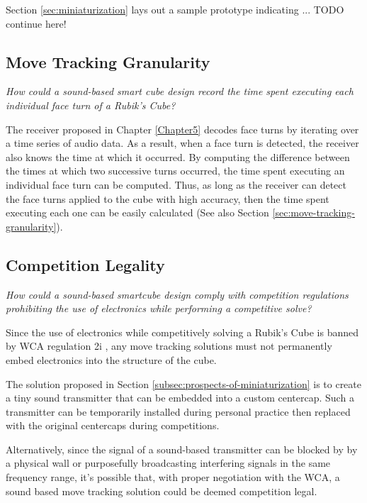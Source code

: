 Section \ref{sec:miniaturization} lays out a sample prototype indicating ... TODO continue here!

\subsection{Move Tracking Granularity}
\label{subsec:answer-granularity}

\emph{How could a sound-based smart cube design record the time spent
executing each individual face turn of a Rubik's Cube?}

The receiver proposed in Chapter \ref{Chapter5} decodes face turns by
iterating over a time series of audio data. As a result, when a face
turn is detected, the receiver also knows the time at which it
occurred. By computing the difference between the times at which two
successive turns occurred, the time spent executing an individual face
turn can be computed. Thus, as long as the receiver can detect the face
turns applied to the cube with high accuracy, then the time spent
executing each one can be easily calculated (See also Section
\ref{sec:move-tracking-granularity}).


\subsection{Competition Legality}
\label{subsec:answer-competition-legality}

\emph{How could a sound-based smartcube design comply with competition
regulations prohibiting the use of electronics while performing a
competitive solve?}

Since the use of electronics while competitively solving a Rubik's Cube
is banned by WCA regulation 2i \cite{wca-regulations}, any move
tracking solutions must not permanently embed electronics into the
structure of the cube.

The solution proposed in Section
\ref{subsec:prospects-of-miniaturization} is to create a tiny sound
transmitter that can be embedded into a custom centercap. Such a
transmitter can be temporarily installed during personal practice then
replaced with the original centercaps during competitions.

Alternatively, since the signal of a sound-based transmitter can be
blocked by by a physical wall or purposefully broadcasting interfering
signals in the same frequency range, it's possible that, with proper
negotiation with the WCA, a sound based move tracking solution could be
deemed competition legal.


